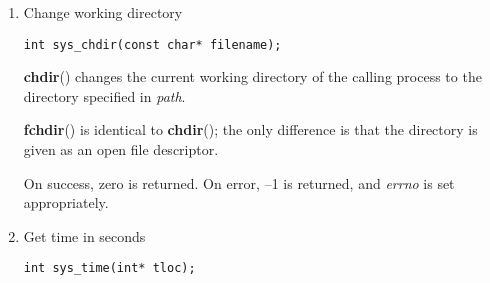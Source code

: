 \documentclass[twoside]{article}
\begin{document}
\begin{multicols}{2}
\begin{enumerate}
{\footnotesize
\begin{lstlisting}
int main(int argc, char *argv[], 
         char *envp[]);
\end{lstlisting}
\par}

On kernel 2.6.23 and later, most architectures support a size limit
derived from the soft
{\bf RLIMIT\_STACK}
resource limit (see
{\bf getrlimit}{\rm (2))}
that is in force at the time of the
{\bf execve}{\rm ()}
call.
(Architectures with no memory management unit are excepted:
they maintain the limit that was in effect before kernel 2.6.23.)
This change allows programs to have a much larger
argument and/or environment list.

For these architectures, the total size is limited to 1/4 of the allowed
stack size.
(Imposing the 1/4-limit
ensures that the new program always has some stack space.)
Since Linux 2.6.25,
the kernel places a floor of 32 pages on this size limit,
so that, even when
{\bf RLIMIT\_STACK}
is set very low,
applications are guaranteed to have at least as much argument and
environment space as was provided by Linux 2.6.23 and earlier.
(This guarantee was not provided in Linux 2.6.23 and 2.6.24.)
Additionally, the limit per string is 32 pages (the kernel constant
{\bf MAX\_ARG\_STRLEN}{\rm ),}
and the maximum number of strings is 0x7FFFFFFF.

{\bf execve}{\rm ()}
does not return on success, and the text, data, bss, and
stack of the calling process are overwritten by that of the program
loaded.


\item
Change working directory
{\footnotesize
\begin{lstlisting}
int sys_chdir(const char* filename);
\end{lstlisting}
\par}

{\bf chdir}{\rm ()}
changes the current working directory of the calling process to the
directory specified in
{\it path}{\rm .}
\par
{\bf fchdir}{\rm ()}
is identical to
{\bf chdir}{\rm ();}
the only difference is that the directory is given as an
open file descriptor.

On success, zero is returned.
On error, --1 is returned, and
{\it errno}
is set appropriately.

\item
Get time in seconds
{\footnotesize
\begin{lstlisting}
int sys_time(int* tloc);
\end{lstlisting}
\par}


\end{enumerate}
\end{multicols}
\end{document}
